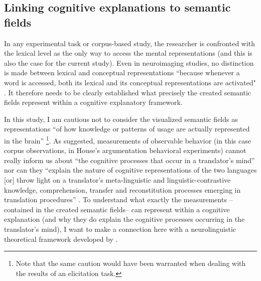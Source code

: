 \subsection{Linking cognitive explanations to semantic fields}
\label{sec:5.1.2}  
In any experimental task or corpus-based study, the researcher is confronted with the lexical level as the only way to access the mental representations (and this is also the case for the current study). Even in neuroimaging studies, no distinction is made between lexical and conceptual representations “because whenever a word is accessed, both its lexical and its conceptual representations are activated" \citep[200--201]{paradis_neurolinguistic_2004}. It therefore needs to be clearly established what precisely the created semantic fields represent within a cognitive explanatory framework.

In this study, I am cautious not to consider the visualized semantic fields as representations “of how knowledge or patterns of usage are actually represented in the brain” \citep[146]{divjak_structuring_2010}\footnote{Note that the same caution would have been warranted when dealing with the results of an elicitation task.}. As \citet[51]{house_towards_2013} suggested, measurements of observable behavior (in this case corpus observations, in House’s argumentation behavioral experiments) cannot really inform us about “the cognitive processes that occur in a translator’s mind” nor can they “explain the nature of cognitive representations of the two languages [or] throw light on a translator’s meta-linguistic and linguistic-contrastive knowledge, comprehension, transfer and reconstitution processes emerging in translation procedures” \citep[50--51]{house_towards_2013}. To understand what exactly the measurements – contained in the created semantic fields– can represent within a cognitive explanation (and why they do explain the cognitive processes occurring in the translator’s mind), I want to make a connection here with a neurolinguistic theoretical framework developed by \citet{paradis_neurolinguistic_2004, kecskes_neurofunctional_2007}. 

